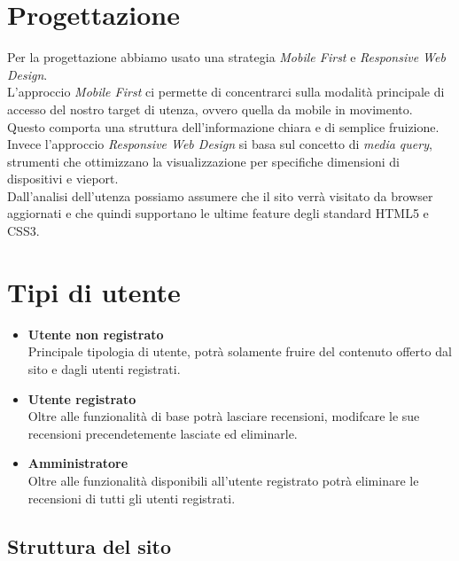 \section{Progettazione}

Per la progettazione abbiamo usato una strategia \textit{Mobile First} e \textit{Responsive Web Design}.\\
L'approccio \textit{Mobile First} ci permette di concentrarci sulla modalità principale di accesso del nostro target di utenza, ovvero quella da mobile in movimento. Questo comporta una struttura dell'informazione chiara e di semplice fruizione.\\
Invece l'approccio \textit{Responsive Web Design} si basa sul concetto di \textit{media query}, strumenti che ottimizzano la visualizzazione per specifiche dimensioni di dispositivi e vieport.\\
Dall'analisi dell'utenza possiamo assumere che il sito verrà visitato da browser aggiornati e che quindi supportano le ultime feature degli standard HTML5 e CSS3.\\

\section{Tipi di utente}

\begin{itemize}
    \item \textbf{Utente non registrato}\\ Principale tipologia di utente, potrà solamente fruire del contenuto offerto dal sito e dagli utenti registrati.
    \item \textbf{Utente registrato}\\ Oltre alle funzionalità di base potrà lasciare recensioni, modifcare le sue recensioni precendetemente lasciate ed eliminarle.
    \item \textbf{Amministratore} \\ Oltre alle funzionalità disponibili all'utente registrato potrà eliminare le recensioni di tutti gli utenti registrati.
\end{itemize}


\subsection{Struttura del sito}

